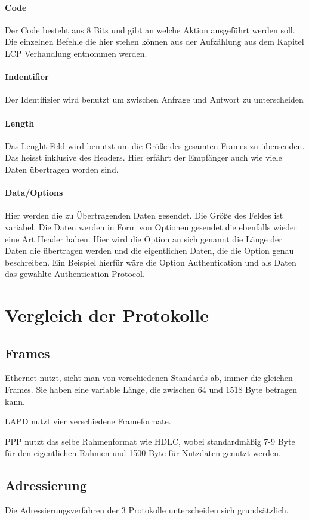 \documentclass[12pt, a4paper, ngerman]{article}
\begin{document}
\paragraph{Code}
Der Code besteht aus 8 Bits und gibt an welche Aktion ausgeführt werden soll. Die einzelnen Befehle die hier stehen können aus der Aufzählung aus dem Kapitel LCP Verhandlung entnommen werden.

\paragraph{Indentifier}
Der Identifizier wird benutzt um zwischen Anfrage und Antwort zu unterscheiden

\paragraph{Length}
Das Lenght Feld wird benutzt um die Größe des gesamten Frames zu übersenden. Das heisst inklusive des Headers. Hier erfährt der Empfänger auch wie viele Daten übertragen worden sind.
\paragraph{Data/Options}
Hier werden die zu Übertragenden Daten gesendet. Die Größe des Feldes ist variabel. Die Daten werden in Form von Optionen gesendet die ebenfalls wieder eine Art Header haben. Hier wird die Option an sich genannt die Länge der Daten die übertragen werden und die eigentlichen Daten, die die Option genau beschreiben. Ein Beispiel hierfür wäre die Option Authentication und als Daten das gewählte Authentication-Protocol.

\section{Vergleich der Protokolle}
\subsection{Frames}
Ethernet nutzt, sieht man von verschiedenen Standards ab, immer die gleichen Frames. Sie haben eine variable Länge, die zwischen 64 und 1518 Byte betragen kann.

LAPD nutzt vier verschiedene Frameformate. 

PPP nutzt das selbe Rahmenformat wie HDLC, wobei standardmäßig 7-9 Byte für den eigentlichen Rahmen und 1500 Byte für Nutzdaten genutzt werden.
\subsection{Adressierung}
Die Adressierungsverfahren der 3 Protokolle unterscheiden sich grundsätzlich. 
\end{document}
